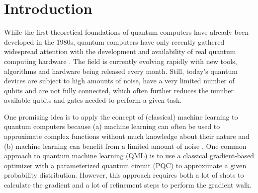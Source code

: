 \chapter{Introduction}
\label{chap:intro}


While the first theoretical foundations of quantum computers have already been
developed in the 1980s, quantum computers have only recently gathered widespread
attention with the development and availability of real quantum computing
hardware \cite{nielsen_quantum_2007,hidary_quantum_2021}.
The field is currently evolving rapidly with new tools, algorithms and hardware
being released every month. %
Still, today's quantum devices are subject to high amounts of noise, have a very
limited number of qubits and are not fully connected, which often further
reduces the number available qubits and gates needed to perform a given task.

One promising idea is to apply the concept of (classical) machine learning to
quantum computers because (a) machine learning can often be used to approximate
complex functions without much knowledge about their nature and
(b) machine learning can benefit from a limited amount of noise
\cite{ciliberto_quantum_2018}.
One common approach to quantum machine learning (QML) is to use a classical
gradient-based optimizer with a parameterized quantum circuit (PQC) to
approximate a given probability distribution.
However, this approach requires both a lot of shots to calculate the gradient
and a lot of refinement steps to perform the gradient walk.

